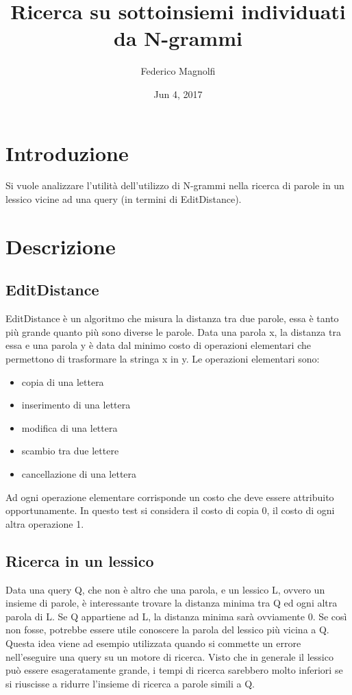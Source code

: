 \documentclass[]{article}
\begin{document}
\title{Ricerca su sottoinsiemi individuati da N-grammi}
\author{Federico Magnolfi}
\date{Jun 4, 2017}
\maketitle


\section{Introduzione}
Si vuole analizzare l’utilità dell’utilizzo di N-grammi nella ricerca di parole in un lessico vicine ad una query (in termini di EditDistance).

\section{Descrizione}
\subsection*{EditDistance}
EditDistance è un algoritmo che misura la distanza tra due parole, essa è tanto più grande quanto più sono diverse le parole. Data una parola x, la distanza tra essa e una parola y è data dal minimo costo di operazioni elementari che permettono di trasformare la stringa x in y. Le operazioni elementari sono:
\begin{itemize}
\item copia di una lettera
\item inserimento di una lettera
\item modifica di una lettera
\item scambio tra due lettere
\item cancellazione di una lettera
\end{itemize}
Ad ogni operazione elementare corrisponde un costo che deve essere attribuito opportunamente.
In questo test si considera il costo di copia 0, il costo di ogni altra operazione 1.

\subsection*{Ricerca in un lessico}
Data una query Q, che non è altro che una parola, e un lessico L, ovvero un insieme di parole, è interessante trovare la distanza minima tra Q ed ogni altra parola di L.
Se Q appartiene ad L, la distanza minima sarà ovviamente 0. Se così non fosse, potrebbe essere utile conoscere la parola del lessico più vicina a Q.
Questa idea viene ad esempio utilizzata quando si commette un errore nell'eseguire una query su un motore di ricerca.
Visto che in generale il lessico può essere esageratamente grande, i tempi di ricerca sarebbero molto inferiori se si riuscisse a ridurre l'insieme di ricerca a parole simili a Q.
\end{document}
